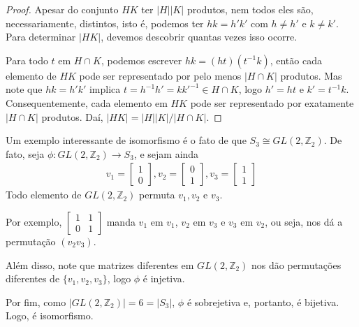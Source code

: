 	\begin{proof}
		Apesar do conjunto $HK$ ter $|H||K|$ produtos, nem todos eles são, necessariamente, distintos, isto é, podemos ter $hk = h'k'$ com $h\neq h'$ e $k\neq k'$. Para determinar $|HK|$, devemos descobrir quantas vezes isso ocorre. 
		\par\vspace{0.3cm} Para todo $t$ em $H\cap K$, podemos escrever $hk = (ht)(t^{-1}k)$, então cada elemento de $HK$ pode ser representado por pelo menos $|H\cap K|$ produtos. Mas note que $hk = h'k'$ implica $t = h^{-1}h' = kk'^{-1}\in H\cap K$, logo $h' = ht$ e $k' = t^{-1}k$. Consequentemente, cada elemento em $HK$ pode ser representado por exatamente $|H\cap K|$ produtos. Daí, $|HK| = |H||K|/|H\cap K|$.
	\end{proof}
	\par\vspace{0.3cm} Um exemplo interessante de isomorfismo é o fato de que $S_3\cong GL(2,\mathbb{Z}_2)$. De fato, seja $\phi:GL(2,\mathbb{Z}_2)\to S_3$, e sejam ainda
	\begin{align*}
	v_1 = \begin{bmatrix}
	1 \\
	0
	\end{bmatrix}, 
	v_2 =  \begin{bmatrix}
	0 \\ 
	1
	\end{bmatrix}, 
	v_3 = \begin{bmatrix}
	1 \\ 
	1
	\end{bmatrix}
	\end{align*}
	Todo elemento de $GL(2,\mathbb{Z}_2)$ permuta $v_1, v_2$ e $v_3$.
	\par\vspace{0.3cm} Por exemplo, $\begin{bmatrix}
	1 & 1 \\ 
	0 & 1
	\end{bmatrix}$
	manda $v_1$ em $v_1$, $v_2$ em $v_3$ e $v_3$ em $v_2$, ou seja, nos dá a permutação $(v_2v_3)$.
	\par\vspace{0.3cm} Além disso, note que matrizes diferentes em $GL(2, \mathbb{Z}_2)$ nos dão permutações diferentes de $\{v_1, v_2,v_3\}$, logo $\phi$ é injetiva.
	\par\vspace{0.3cm} Por fim, como $|GL(2, \mathbb{Z}_2)| = 6 = |S_3|$, $\phi$ é sobrejetiva e, portanto, é bijetiva. Logo, é isomorfismo. 
